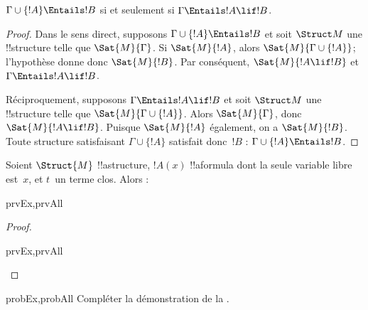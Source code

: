 \documentclass[../../../include/open-logic-section]{subfiles}
\begin{document}
\begin{thm}
$\Gamma \cup \{!A\} \Entails !B$ si et seulement si
$\Gamma \Entails !A \lif !B$.
\end{thm}

\begin{proof}
Dans le sens direct, supposons
$\Gamma \cup \{ !A \} \Entails !B$ et soit $\Struct M$ une
!!{structure} telle que $\Sat{M}{\Gamma}$. Si $\Sat{M}{!A}$,
alors $\Sat{M}{\Gamma \cup \{ !A \} }$; l'hypothèse donne donc
$\Sat{M}{!B}$. Par conséquent, $\Sat{M}{!A \lif !B}$ et
$\Gamma \Entails !A \lif !B$.

Réciproquement, supposons $\Gamma \Entails !A \lif !B$ et soit
$\Struct M$ une !!{structure} telle que
$\Sat{M}{\Gamma \cup \{ !A \}}$. Alors $\Sat{M}{\Gamma}$,
donc $\Sat{M}{!A \lif !B}$. Puisque $\Sat{M}{!A}$ également,
on a $\Sat{M}{!B}$. Toute structure satisfaisant
$\Gamma \cup \{ !A \}$ satisfait donc~$!B$ :
$\Gamma \cup \{ !A \} \Entails !B$.
\end{proof}

\begin{prop}
  Soient $\Struct{M}$ !!a{structure}, $!A(x)$ !!a{formula} dont
  la seule variable libre est~$x$, et $t$~un terme clos. Alors :
  \begin{tagenumerate}{prvEx,prvAll}
  \end{tagenumerate}
\end{prop}

\begin{proof}
  \begin{tagenumerate}{prvEx,prvAll}
  \end{tagenumerate}
\end{proof}

\begin{probtag}{probEx,probAll}
  Compléter la démonstration de la
  .
\end{probtag} 
\end{document}
